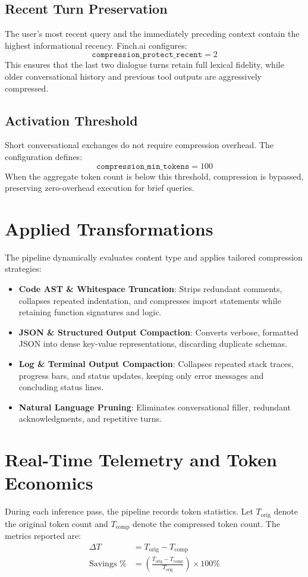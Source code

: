 \subsection{Recent Turn Preservation}
The user's most recent query and the immediately preceding context contain the highest informational recency. Finch.ai configures:
\begin{equation}
    \texttt{compression\_protect\_recent} = 2
\end{equation}
This ensures that the last two dialogue turns retain full lexical fidelity, while older conversational history and previous tool outputs are aggressively compressed.

\subsection{Activation Threshold}
Short conversational exchanges do not require compression overhead. The configuration defines:
\begin{equation}
    \texttt{compression\_min\_tokens} = 100
\end{equation}
When the aggregate token count is below this threshold, compression is bypassed, preserving zero-overhead execution for brief queries.

\section{Applied Transformations}
The pipeline dynamically evaluates content type and applies tailored compression strategies:
\begin{itemize}
    \item \textbf{Code AST \& Whitespace Truncation}: Strips redundant comments, collapses repeated indentation, and compresses import statements while retaining function signatures and logic.
    \item \textbf{JSON \& Structured Output Compaction}: Converts verbose, formatted JSON into dense key-value representations, discarding duplicate schemas.
    \item \textbf{Log \& Terminal Output Compaction}: Collapses repeated stack traces, progress bars, and status updates, keeping only error messages and concluding status lines.
    \item \textbf{Natural Language Pruning}: Eliminates conversational filler, redundant acknowledgments, and repetitive turns.
\end{itemize}

\section{Real-Time Telemetry and Token Economics}
During each inference pass, the pipeline records token statistics. Let $T_{\text{orig}}$ denote the original token count and $T_{\text{comp}}$ denote the compressed token count. The metrics reported are:
\begin{align}
    \Delta T &= T_{\text{orig}} - T_{\text{comp}} \\
    \text{Savings \%} &= \left( \frac{T_{\text{orig}} - T_{\text{comp}}}{T_{\text{orig}}} \right) \times 100\%
\end{align}

